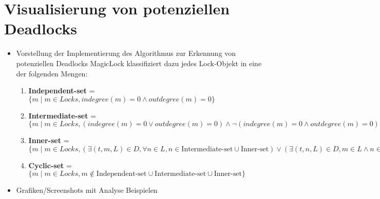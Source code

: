 \begin{listing}[ht]
  \inputminted[frame=lines,linenos,firstline=42,lastline=44]{python}{./Python/generateTimeline.py}
  \caption{generateTimeline.py: Auszug aus der Erzeugung des Graphen}
  \label{lst:GenerateTimeline_PlotGraph}
\end{listing}

\section{Visualisierung von potenziellen Deadlocks}
\label{section:Implementierung:Visualisierung von potenziellen Deadlocks}
\begin{itemize}
  \item Vorstellung der Implementierung des Algorithmus zur Erkennung von
  potenziellen Deadlocks MagicLock klassifiziert dazu jedes Lock-Objekt in eine
  der folgenden Mengen:
  \begin{enumerate}
    \item \textbf{Independent-set} = $\{m \mid m \in Locks, indegree(m) = 0
    \land outdegree(m) = 0\}$
    \item \textbf{Intermediate-set} = $\{m \mid m \in Locks, (indegree(m) = 0
    \lor outdegree(m) = 0) \land \lnot (indegree(m) = 0 \land outdegree(m) =
    0)\}$
    \item \textbf{Inner-set} = $\{m \mid m \in Locks, (\exists (t,m,L) \in D,
    \forall n \in L, n \in \text{Intermediate-set} \cup \text{Inner-set}) \lor
    (\exists (t,n,L) \in D, m \in L \land n \in \text{Intermediate-set} \cup
    \text{Inner-set})\}$
    \item \textbf{Cyclic-set} = $\{m \mid m \in Locks, m \notin
    \text{Independent-set} \cup \text{Intermediate-set} \cup \text{Inner-set}\}$
  \end{enumerate}
  \item Grafiken/Screenshots mit Analyse Beispielen
\end{itemize}